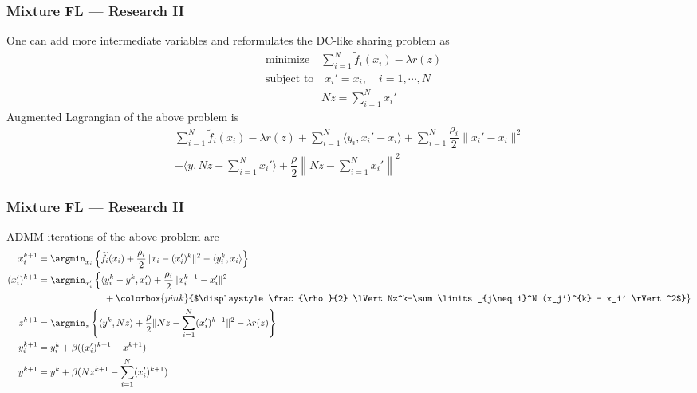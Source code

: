 \begin{frame}
\frametitle{Mixture FL --- Research II}

One can add more intermediate variables and reformulates the DC-like sharing problem as
\begin{align*}
    & \text{minimize} \quad \sum\limits_{i=1}^N \widetilde{f}_i(x_i) - \lambda r(z) \\
    & \text{subject to} \quad x_i' = x_i, \quad i=1,\cdots,N \\
    & \phantom{subject to} \quad Nz = \sum\limits_{i=1}^N x_i'
\end{align*}
Augmented Lagrangian of the above problem is
{\footnotesize
\begin{multline*}
    \sum\limits_{i=1}^N \widetilde{f}_i(x_i) - \lambda r(z) + \sum\limits_{i=1}^N \langle y_i, x_i'-x_i\rangle + \sum\limits_{i=1}^N \dfrac{\rho_i}{2} \lVert x_i'-x_i \rVert^2 \\
    + \langle y, Nz-\sum\limits_{i=1}^N x_i'\rangle + \dfrac{\rho}{2} \left\lVert Nz-\sum\limits_{i=1}^N x_i' \right\rVert^2
\end{multline*}
}

\end{frame}


\begin{frame}
\frametitle{Mixture FL --- Research II}

ADMM iterations of the above problem are
{\footnotesize
\begin{align*}
    x_i^{k+1} & = \argmin_{x_i} \left\{ \widetilde{f}_i(x_i) + \frac{\rho_i}{2} \lVert x_i-(x_i')^k \rVert^2 - \langle y_i^k, x_i \rangle \right\} \\
    (x_i')^{k+1} & = \argmin_{x_i'} \left\{ \langle y_i^k-y^k, x_i' \rangle + \frac{\rho_i}{2} \lVert x_i^{k+1}-x_i' \rVert^2 \right. \\
    & \hspace{7em} + \colorbox{pink}{$\displaystyle \frac{\rho}{2} \lVert Nz^k-\sum\limits_{j\neq i}^N (x_j')^{k} - x_i' \rVert^2$} \} \\
    z^{k+1} & = \argmin_{z} \left\{ \langle y^k, Nz \rangle + \frac{\rho}{2} \lVert Nz - \sum\limits_{i=1}^N (x_i')^{k+1} \rVert^2 - \lambda r(z) \right\} \\
    y_i^{k+1} & = y_i^k + \beta ((x_i')^{k+1} - x^{k+1}) \\
    y^{k+1} & = y^k + \beta (Nz^{k+1} - \sum\limits_{i=1}^N (x_i')^{k+1})
\end{align*}
}

\end{frame}

